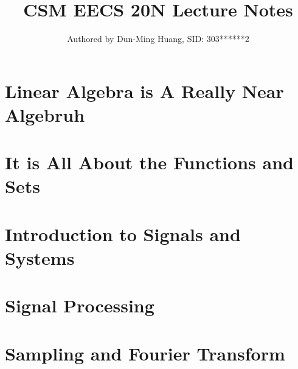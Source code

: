 \documentclass[openany]{book}
\title{CSM EECS 20N Lecture Notes}
\author{Authored by Dun-Ming Huang, SID: 303******2}
\begin{document}
\maketitle
\setcounter{tocdepth}{1}

\tableofcontents
\part{Linear Algebra is A Really Near Algebruh}

\newpage

\newpage

\newpage

\newpage

\newpage

\newpage

\newpage

\newpage


\part{It is All About the Functions and Sets}

\newpage

\newpage


\part{Introduction to Signals and Systems}

\newpage

\newpage

\newpage

\newpage

\newpage

\newpage


\part{Signal Processing}

\newpage

\newpage

\newpage

\newpage

\newpage

\newpage

\newpage


\part{Sampling and Fourier Transform}

\newpage

\newpage

\newpage

\newpage

\end{document}
